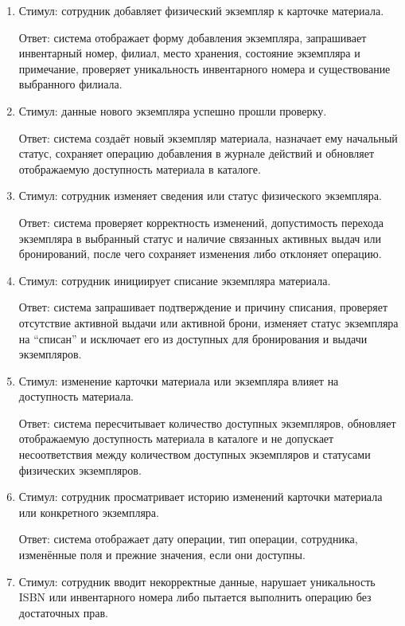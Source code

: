 \documentclass[12pt,a4paper]{article}
\begin{document}
\begin{enumerate}
		\item Стимул: сотрудник добавляет физический экземпляр к карточке материала.
		
		Ответ: система отображает форму добавления экземпляра, запрашивает инвентарный
		номер, филиал, место хранения, состояние экземпляра и примечание, проверяет
		уникальность инвентарного номера и существование выбранного филиала.
		
		\item Стимул: данные нового экземпляра успешно прошли проверку.
		
		Ответ: система создаёт новый экземпляр материала, назначает ему начальный
		статус, сохраняет операцию добавления в журнале действий и обновляет
		отображаемую доступность материала в каталоге.
		
		\item Стимул: сотрудник изменяет сведения или статус физического экземпляра.
		
		Ответ: система проверяет корректность изменений, допустимость перехода
		экземпляра в выбранный статус и наличие связанных активных выдач или
		бронирований, после чего сохраняет изменения либо отклоняет операцию.
		
		\item Стимул: сотрудник инициирует списание экземпляра материала.
		
		Ответ: система запрашивает подтверждение и причину списания, проверяет
		отсутствие активной выдачи или активной брони, изменяет статус экземпляра
		на ``списан'' и исключает его из доступных для бронирования и выдачи экземпляров.
		
		\item Стимул: изменение карточки материала или экземпляра влияет на доступность
		материала.
		
		Ответ: система пересчитывает количество доступных экземпляров, обновляет
		отображаемую доступность материала в каталоге и не допускает несоответствия
		между количеством доступных экземпляров и статусами физических экземпляров.
		
		\item Стимул: сотрудник просматривает историю изменений карточки материала
		или конкретного экземпляра.
		
		Ответ: система отображает дату операции, тип операции, сотрудника, изменённые
		поля и прежние значения, если они доступны.
		
		\item Стимул: сотрудник вводит некорректные данные, нарушает уникальность ISBN
		или инвентарного номера либо пытается выполнить операцию без достаточных прав.
		

\end{enumerate}
\end{document}
